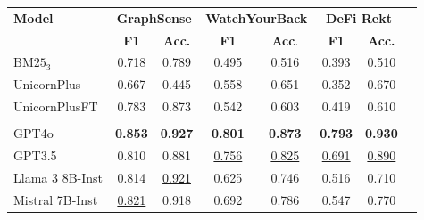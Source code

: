 \begin{tabular*}{\textwidth}{@{\extracolsep{\fill}}lccccccc}
\toprule
\multirow{2}{*}{\textbf{Model}} & \multicolumn{2}{c}{\textbf{GraphSense}} & \multicolumn{2}{c}{\textbf{WatchYourBack}} & \multicolumn{2}{c}{\textbf{DeFi Rekt}} \\
\cmidrule(lr){2-3} \cmidrule(lr){4-5} \cmidrule(lr){6-7}
 & \textbf{F1} & \textbf{Acc.} & \textbf{F1} & \textbf{Acc}. & \textbf{F1} & \textbf{Acc.} \\
\midrule
$\text{BM25}_3$             & 0.718 & 0.789 & 0.495 & 0.516 & 0.393 & 0.510 \\
UnicornPlus                 & 0.667 & 0.445 & 0.558 & 0.651 & 0.352 & 0.670 \\
UnicornPlusFT               & 0.783 & 0.873 & 0.542 & 0.603 & 0.419 & 0.610 \\
\\
GPT4o                       & \textbf{0.853} & \textbf{0.927} & \textbf{0.801} & \textbf{0.873} & \textbf{0.793} & \textbf{0.930} \\
GPT3.5                      & 0.810 & 0.881 & \underline{0.756} & \underline{0.825} & \underline{0.691} & \underline{0.890} \\
Llama 3 8B-Inst             & 0.814 & \underline{0.921} & 0.625 & 0.746 & 0.516 & 0.710 \\
Mistral 7B-Inst             & \underline{0.821} & 0.918 & 0.692 & 0.786 & 0.547 & 0.770 \\
\bottomrule
\end{tabular*}

